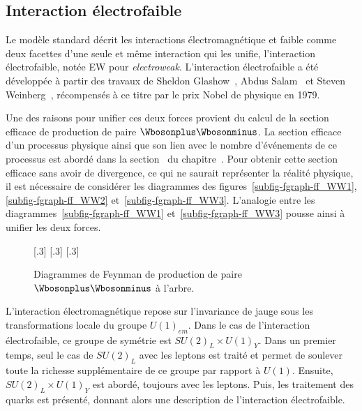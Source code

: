 \subsection{Interaction électrofaible}\label{chapter-MS-MSSM-section-formalisme-subsec-EW}
Le modèle standard décrit les interactions électromagnétique et faible comme deux facettes d'une seule et même interaction qui les unifie, l'interaction électrofaible, notée \og EW \fg{} pour \emph{electroweak}.
L'interaction électrofaible a été développée à partir des travaux de Sheldon Glashow~\cite{Glashow_EW}, Abdus Salam~\cite{Salam_EW} et Steven Weinberg~\cite{Weinberg_leptons_model}, récompensés à ce titre par le prix Nobel de physique en 1979.
\par Une des raisons pour unifier ces deux forces provient du calcul de la section efficace de production de paire $\Wbosonplus\Wbosonminus$.
La section efficace d'un processus physique ainsi que son lien avec le nombre d'événements de ce processus est abordé dans la section~ du chapitre~.
Pour obtenir cette section efficace sans avoir de divergence, ce qui ne saurait représenter la réalité physique, il est nécessaire de considérer les diagrammes des figures~\ref{subfig-fgraph-ff_WW1}, \ref{subfig-fgraph-ff_WW2} et~\ref{subfig-fgraph-ff_WW3}. L'analogie entre les diagrammes~\ref{subfig-fgraph-ff_WW1} et~\ref{subfig-fgraph-ff_WW3} pousse ainsi à unifier les deux forces.
\begin{figure}[h]
\centering
\vspace{\baselineskip}
\subcaptionbox{\label{subfig-fgraph-ff_WW1}}[.3\textwidth]
{\vspace{\baselineskip}}
\hfill
\subcaptionbox{\label{subfig-fgraph-ff_WW2}}[.3\textwidth]
{\vspace{\baselineskip}}
\hfill
\subcaptionbox{\label{subfig-fgraph-ff_WW3}}[.3\textwidth]
{\vspace{\baselineskip}}

\caption{Diagrammes de Feynman de production de paire $\Wbosonplus\Wbosonminus$ à l'arbre.}
\label{fig-fgraph-ff_WW}
\end{figure}
\par L'interaction électromagnétique repose sur l'invariance de jauge sous les transformations locale du groupe $U(1)_{em}$.
Dans le cas de l'interaction électrofaible, ce groupe de symétrie est $SU(2)_L \times U(1)_Y$. Dans un premier temps, seul le cas de $SU(2)_L$ avec les leptons est traité et permet de soulever toute la richesse supplémentaire de ce groupe par rapport à $U(1)$. Ensuite, $SU(2)_L \times U(1)_Y$ est abordé, toujours avec les leptons. Puis, les traitement des quarks est présenté, donnant alors une description de l'interaction électrofaible.
